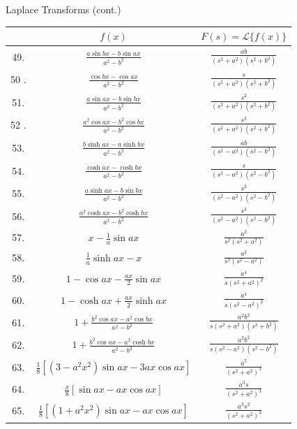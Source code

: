 \documentclass[10pt]{article}
\begin{document}
Laplace Transforms (cont.)

\begin{center}
\begin{tabular}{|c|c|c|}
\hline
 & $f(x)$ & $F(s)=\mathscr{L}\{f(x)\}$ \\
\hline
49. & $\frac{a \sin b x-b \sin a x}{a^{2}-b^{2}}$ & $\frac{a b}{\left(s^{2}+a^{2}\right)\left(s^{2}+b^{2}\right)}$ \\
\hline
50 . & $\frac{\cos b x-\cos a x}{a^{2}-b^{2}}$ & $\frac{s}{\left(s^{2}+a^{2}\right)\left(s^{2}+b^{2}\right)}$ \\
\hline
51. & $\frac{a \sin a x-b \sin b x}{a^{2}-b^{2}}$ & $\frac{s^{2}}{\left(s^{2}+a^{2}\right)\left(s^{2}+b^{2}\right)}$ \\
\hline
52 . & $\frac{a^{2} \cos a x-b^{2} \cos b x}{a^{2}-b^{2}}$ & $\frac{s^{3}}{\left(s^{2}+a^{2}\right)\left(s^{2}+b^{2}\right)}$ \\
\hline
53. & $\frac{b \sinh a x-a \sinh b x}{a^{2}-b^{2}}$ & $\frac{a b}{\left(s^{2}-a^{2}\right)\left(s^{2}-b^{2}\right)}$ \\
\hline
54. & $\frac{\cosh a x-\cosh b x}{a^{2}-b^{2}}$ & $\frac{s}{\left(s^{2}-a^{2}\right)\left(s^{2}-b^{2}\right)}$ \\
\hline
55. & $\frac{a \sinh a x-b \sin b x}{a^{2}-b^{2}}$ & $\frac{s^{2}}{\left(s^{2}-a^{2}\right)\left(s^{2}-b^{2}\right)}$ \\
\hline
56. & $\frac{a^{2} \cosh a x-b^{2} \cosh b x}{a^{2}-b^{2}}$ & $\frac{s^{3}}{\left(s^{2}-a^{2}\right)\left(s^{2}-b^{2}\right)}$ \\
\hline
57. & $x-\frac{1}{a} \sin a x$ & $\frac{a^{2}}{s^{2}\left(s^{2}+a^{2}\right)}$ \\
\hline
58. & $\frac{1}{a} \sinh a x-x$ & $\frac{a^{2}}{s^{2}\left(s^{2}-a^{2}\right)}$ \\
\hline
59. & $1-\cos a x-\frac{a x}{2} \sin a x$ & $\frac{a^{4}}{s\left(s^{2}+a^{2}\right)^{2}}$ \\
\hline
60. & $1-\cosh a x+\frac{a x}{2} \sinh a x$ & $\frac{a^{4}}{s\left(s^{2}-a^{2}\right)^{2}}$ \\
\hline
61. & $1+\frac{b^{2} \cos a x-a^{2} \cos b x}{a^{2}-b^{2}}$ & $\frac{a^{2} b^{2}}{s\left(s^{2}+a^{2}\right)\left(s^{2}+b^{2}\right)}$ \\
\hline
62. & $1+\frac{b^{2} \cos a x-a^{2} \cosh b x}{a^{2}-b^{2}}$ & $\frac{a^{2} b^{2}}{s\left(s^{2}-a^{2}\right)\left(s^{2}-b^{2}\right)}$ \\
\hline
63. & $\frac{1}{8}\left[\left(3-a^{2} x^{2}\right) \sin a x-3 a x \cos a x\right]$ & $\frac{a^{5}}{\left(s^{2}+a^{2}\right)^{3}}$ \\
\hline
64. & $\frac{x}{8}[\sin a x-a x \cos a x]$ & $\frac{a^{3} s}{\left(s^{2}+a^{2}\right)^{3}}$ \\
\hline
65. & $\frac{1}{8}\left[\left(1+a^{2} x^{2}\right) \sin a x-a x \cos a x\right]$ & $\frac{a^{3} s^{2}}{\left(s^{2}+a^{2}\right)^{3}}$ \\
\hline
\end{tabular}
\end{center}
\end{document}

